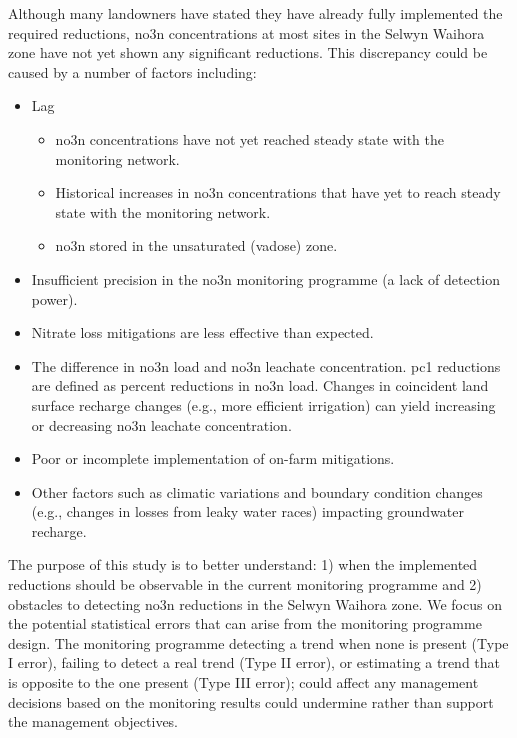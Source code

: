 Although many landowners have stated they have already fully implemented the required reductions\citep{scottpc}, \gls{no3n} concentrations at most sites in the Selwyn Waihora zone have not yet shown any significant reductions\citep{scottpc}.
This discrepancy could be caused by a number of factors including:
\begin{itemize}
    \item Lag
    \begin{itemize}
        \item \gls{no3n} concentrations have not yet reached steady state with the monitoring network.
        \item Historical increases in \gls{no3n} concentrations that have yet to reach steady state with the monitoring network.
        \item \gls{no3n} stored in the unsaturated (vadose) zone.
    \end{itemize}
    \item Insufficient precision in the \gls{no3n} monitoring programme (a lack of detection power).
    \item Nitrate loss mitigations are less effective than expected.
    \item The difference in \gls{no3n} load and \gls{no3n} leachate concentration. \gls{pc1} reductions are defined as percent reductions in \gls{no3n} load. Changes in coincident land surface recharge changes (e.g., more efficient irrigation) can yield increasing or decreasing \gls{no3n} leachate concentration.
    \item Poor or incomplete implementation of on-farm mitigations.
    \item Other factors such as climatic variations and boundary condition changes (e.g., changes in losses from leaky water races) impacting groundwater recharge.
\end{itemize}

The purpose of this study is to better understand: 1) when the implemented reductions should be observable in the current monitoring programme and 2) obstacles to detecting \gls{no3n} reductions in the Selwyn Waihora zone.
We focus on the potential statistical errors that can arise from the monitoring programme design.
The monitoring programme detecting a trend when none is present (Type I error), failing to detect a real trend (Type II error), or estimating a trend that is opposite to the one present (Type III error); could affect any management decisions based on the monitoring results could undermine rather than support the management objectives.
